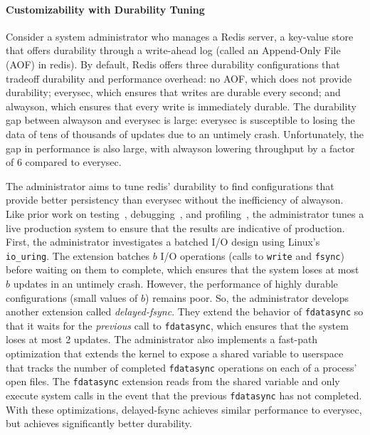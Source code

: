 \paragraph{Customizability with Durability Tuning}

Consider a system administrator who manages a Redis server, a key-value store that offers durability through a write-ahead log (called an Append-Only File (AOF) in redis).  By default, Redis offers three durability configurations that tradeoff durability and performance overhead: no AOF, which does not provide durability; everysec, which ensures that writes are durable every second; and alwayson, which ensures that every write is immediately durable.  The durability gap between alwayson and everysec is large: everysec is susceptible to losing the data of tens of thousands of updates due to an untimely crash.  Unfortunately, the gap in performance is also large, with alwayson lowering throughput by a factor of 6 compared to everysec. 

The administrator aims to tune redis' durability to find configurations that provide better persistency than everysec without the inefficiency of alwayson.  Like prior work on testing~\cite{Veeraraghavan16, Veeraraghavan18}, debugging~\cite{Kasikci13, Kasikci15}, and profiling~\cite{Pancheko19}, the administrator tunes a live production system to ensure that the results are indicative of production.  First, the administrator investigates a batched I/O design using Linux's \texttt{io\_uring}.  The extension batches $b$ I/O operations (calls to \texttt{write} and \texttt{fsync}) before waiting on them to complete, which ensures that the system loses at most $b$ updates in an untimely crash.  However, the performance of highly durable configurations (\ie small values of $b$) remains poor.  So, the administrator develops another extension called \emph{delayed-fsync}.  They extend the behavior of \texttt{fdatasync} so that it waits for the \emph{previous} call to \texttt{fdatasync}, which ensures that the system loses at most 2 updates.   The administrator also implements a fast-path optimization that extends the kernel to expose a shared variable to userspace that tracks the number of completed \texttt{fdatasync} operations on each of a process' open files.  The \texttt{fdatasync} extension reads from the shared variable and only execute system calls in the event that the previous \texttt{fdatasync} has not completed.  With these optimizations, delayed-fsync achieves similar performance to everysec, but achieves significantly better durability. 

